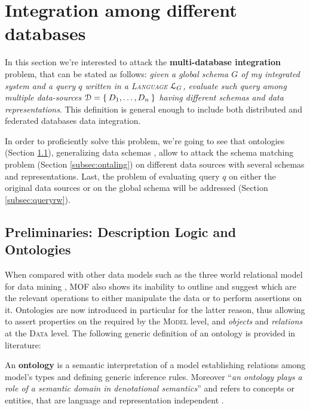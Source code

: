 \section{Integration among different databases}\label{sec:integsurvey}
In this section we're interested to attack the \textbf{multi-database integration} problem, that can be stated as follows: \textit{given a global schema $G$ of my integrated system and a query $q$ written in a  \textsc{Language} $\langg_G$, evaluate such query among multiple data-sources $\mathcal{D}=\Set{D_1,\dots, D_n}$ having   different schemas and data representations}. This definition is general enough to include both distributed and federated databases data integration.

In order to proficiently solve this problem, we're going to see that ontologies (Section \ref{sec:ontology}), generalizing data schemas  \cite{GangemiP13}, allow to attack the schema matching problem (Section \ref{subsec:ontaling}) on different data sources with several schemas and representations. Last, the problem of evaluating query $q$ on either the original data sources or on the global schema will be addressed (Section \ref{subsec:queryrw}).



\subsection{Preliminaries: Description Logic and Ontologies}\label{sec:ontology}
When compared with other data models such as the three world relational model for data mining \cite{Calders2006}, MOF also shows its inability to outline and suggest which are the relevant operations to either manipulate the data or to perform assertions on it. Ontologies are now introduced in particular for the latter reason, thus allowing to assert properties on the required by the \textsc{Model} level, and \textit{objects} and \textit{relations} at the \textsc{Data} level. The following generic definition of an ontology is provided in literature:

\begin{definition}
	\label{def:taonta}
	An \textbf{ontology} \cite{Allemang2011} is a semantic interpretation of a model establishing relations among model's types and defining generic inference rules. Moreover ``\textit{an ontology plays a role of a semantic domain in denotational semantics}'' \cite{saeki} and refers to concepts or entities, that are language  and representation independent \cite{mathmeta}.
\end{definition}

